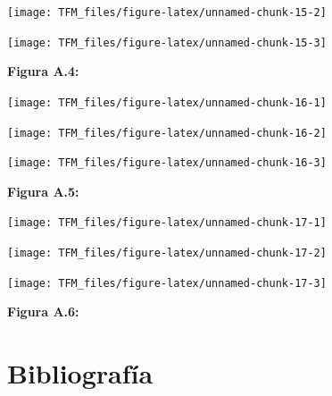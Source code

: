 \documentclass[11pt,spanish,a4paper,oneside,]{book} %
\begin{document}
\begin{center}\texttt{[image: TFM\_files/figure-latex/unnamed-chunk-15-2]} \end{center}

\begin{center}\texttt{[image: TFM\_files/figure-latex/unnamed-chunk-15-3]} \end{center}

\begin{center}
\textbf{Figura A.4:}

\end{center}

\begin{center}\texttt{[image: TFM\_files/figure-latex/unnamed-chunk-16-1]} \end{center}

\begin{center}\texttt{[image: TFM\_files/figure-latex/unnamed-chunk-16-2]} \end{center}

\begin{center}\texttt{[image: TFM\_files/figure-latex/unnamed-chunk-16-3]} \end{center}

\begin{center}
\textbf{Figura A.5:}

\end{center}

\begin{center}\texttt{[image: TFM\_files/figure-latex/unnamed-chunk-17-1]} \end{center}

\begin{center}\texttt{[image: TFM\_files/figure-latex/unnamed-chunk-17-2]} \end{center}

\begin{center}\texttt{[image: TFM\_files/figure-latex/unnamed-chunk-17-3]} \end{center}

\begin{center}
\textbf{Figura A.6:}

\end{center}

\backmatter

\hypertarget{bibliografuxeda}{%
\chapter*{Bibliografía}\label{bibliografuxeda}}
\end{document}
